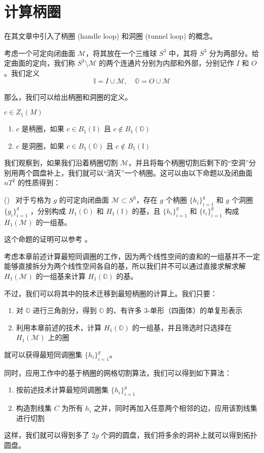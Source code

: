 \section{计算柄圈}

\citet{oncomputinghantun} 在其文章中引入了柄圈 (handle loop) 和洞圈 (tunnel loop) 的概念。

考虑一个可定向闭曲面 $ \mathcal{M} $，将其放在一个三维球 $ S^3 $ 中，其将 $ S^3 $ 分为两部分。给定曲面的定向，我们称 $ S^3 \setminus \mathcal{M} $ 的两个连通片分别为内部和外部，分别记作 $ I $ 和 $ O $。我们定义
$$
\mathbb{I} = I \cup \mathcal{M}, \quad \mathbb{O} = O \cup \mathcal{M}
$$

那么，我们可以给出柄圈和洞圈的定义。

\begin{definition}
    $ c \in Z_1(M) $
    \begin{enumerate}
        \item $ c $ 是柄圈，如果 $ c \in B_1(\mathbb{I}) $ 且 $ c \notin B_1(\mathbb{O}) $
        \item $ c $ 是洞圈，如果 $ c \in B_1(\mathbb{O}) $ 且 $ c \notin B_1(\mathbb{I}) $
    \end{enumerate}
\end{definition}

我们观察到，如果我们沿着柄圈切割 $ \mathcal{M} $，并且将每个柄圈切割后剩下的“空洞”分别用两个圆盘补上，我们就可以“消灭”一个柄圈。这可以由以下命题以及闭曲面 $ nT^2 $ 的性质得到：

\begin{proposition}
    (\citet{oncomputinghantun})~
    对于亏格为 $ g $ 的可定向闭曲面 $ \mathcal{M} \subset S^3 $，存在 $ g $ 个柄圈 $ \{h_i\}_{i=1}^{g} $ 和 $ g $ 个洞圈 $ \{g_i\}_{i=1}^{g} $ ，分别构成 $ H_1(\mathbb{O}) $ 和 $ H_1(\mathbb{I}) $ 的基，且 $ \{h_i\}_{i=1}^{g} $ 和 $ \{t_i\}_{i=1}^{g} $ 构成 $ H_1(\mathcal{M}) $ 的一组基。
\end{proposition}

这个命题的证明可以参考 \citet{oncomputinghantun}。

考虑本章前述计算最短同调圈的工作，因为两个线性空间的直和的一组基并不一定能够直接拆分为两个线性空间各自的基，所以我们并不可以通过直接求解求解 $ H_1(\mathcal{M}) $ 的一组基来计算 $ H_1(\mathbb{O}) $ 的基。

不过，我们可以将其中的技术迁移到最短柄圈的计算上。我们只要：
\begin{enumerate}
    \item 对 $ \mathbb{O} $ 进行三角剖分，得到 $ \mathbb{O} $ 的、有许多 3-单形（四面体）的单复形表示
    \item 利用本章前述的技术，计算 $ H_1(\mathbb{O}) $ 的一组基，并且筛选时只选择在 $ H_1(\mathcal{M}) $ 上的圈
\end{enumerate}
就可以获得最短同调圈集 $ \{h_i\}_{i=1}^{g} $。

同时，应用\citet{ShuangmingChaiThesis}工作中的基于柄圈的网格切割算法，我们可以得到如下算法：
\begin{enumerate}
    \item 按前述技术计算最短同调圈集 $ \{h_i\}_{i=1}^{g} $
    \item 构造割线集 $ C $ 为所有 $ h_i $ 之并，同时再加入任意两个相邻的边，应用该割线集进行切割
\end{enumerate}

这样，我们就可以得到多了 $ 2g $ 个洞的圆盘，我们将多余的洞补上就可以得到拓扑圆盘。